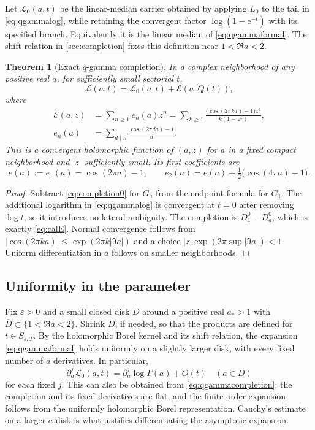 \documentclass[11pt,a4paper]{article}
\numberwithin{equation}{section}
\newtheorem{theorem}{Theorem}[section]
\theoremstyle{definition}
\theoremstyle{remark}
\newcommand{\e}{\mathrm e}
\newcommand{\cL}{\mathcal L}
\newcommand{\cE}{\mathcal E}
\newcommand{\eps}{\varepsilon}
\begin{document}
Let $\cL_0(a,t)$ be the linear-median carrier obtained by applying
$L_0$ to the tail in \eqref{eq:qgammalog}, while retaining the convergent
factor $\log(1-\e^{-t})$ with its specified branch. Equivalently it is
the linear median of \eqref{eq:qgammaformal}. The shift relation in
\cref{sec:completion} fixes this definition near $1<\Re a<2$.

\begin{theorem}[Exact $q$-gamma completion]
\label{thm:qgamma}
In a complex neighborhood of any positive real $a$, for sufficiently
small sectorial $t$,
\begin{equation}
 \cL(a,t)=\cL_0(a,t)+\cE(a,Q(t)),
 \label{eq:qgammacompletion}
\end{equation}
where
\begin{align}
 \cE(a,z)&=\sum_{n\geq1}e_n(a)z^n
 =\sum_{k\geq1}\frac{\big(\cos(2\pi ka)-1\big)z^k}{k(1-z^k)},
 \label{eq:calE}\\
 e_n(a)&=\sum_{d\mid n}\frac{\cos(2\pi da)-1}{d}.
 \label{eq:en}
\end{align}
This is a convergent holomorphic function of $(a,z)$ for $a$ in a
fixed compact neighborhood and $|z|$ sufficiently small. Its first
coefficients are
\begin{equation}
 e(a):=e_1(a)=\cos(2\pi a)-1,\qquad
 e_2(a)=e(a)+\tfrac12\big(\cos(4\pi a)-1\big).
 \label{eq:e12}
\end{equation}
\end{theorem}
\begin{proof}
Subtract \eqref{eq:completion0} for $G_a$ from the endpoint formula for
$G_1$. The additional logarithm in \eqref{eq:qgammalog} is convergent
at $t=0$ after removing $\log t$, so it introduces no lateral
ambiguity. The completion is $D_1^0-D_a^0$, which is exactly
\eqref{eq:calE}. Normal convergence follows from
$|\cos(2\pi ka)|\leq\exp(2\pi k|\Im a|)$ and a choice
$|z|\exp(2\pi\sup|\Im a|)<1$. Uniform differentiation in $a$ follows
on smaller neighborhoods.
\end{proof}

\subsection{Uniformity in the parameter}
Fix $\eps>0$ and a small closed disk $D$ around a positive real
$a_*>1$ with $\overline D\subset\{1<\Re a<2\}$. Shrink $D$, if needed,
so that the products are defined for $t\in S_{\eps,T}$. By the
holomorphic Borel kernel and its shift relation, the expansion
\eqref{eq:qgammaformal} holds uniformly on a slightly larger disk,
with every fixed number of $a$ derivatives. In particular,
\begin{equation}
 \partial_a^j\cL_0(a,t)=\partial_a^j\log\Gamma(a)+O(t)
 \quad (a\in D)
 \label{eq:uniformgamma}
\end{equation}
for each fixed $j$. This can also be obtained from
\eqref{eq:qgammacompletion}: the completion and its fixed derivatives
are flat, and the finite-order expansion follows from the uniformly
holomorphic Borel representation. Cauchy's estimate on a larger
$a$-disk is what justifies differentiating the asymptotic expansion.
\end{document}
